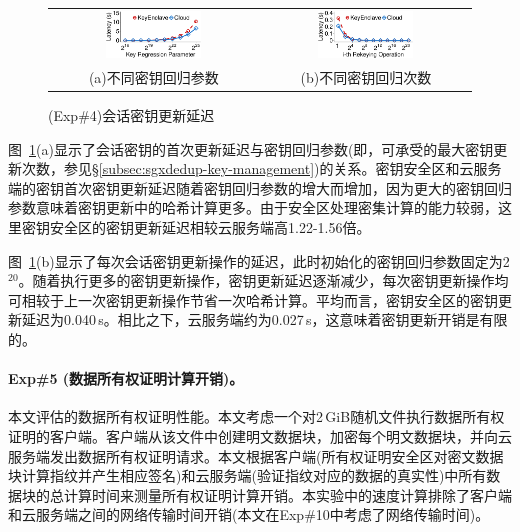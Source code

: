\begin{figure}[!htb]
    \centering
    \begin{tabular}{@{\ }c@{\ }c}
        \includegraphics[width=0.48\textwidth]{pic/sgxdedup/plot/exp_a5/expa5_keyRegression_time.pdf} & 
        \includegraphics[width=0.48\textwidth]{pic/sgxdedup/plot/exp_a5/expa5_keyRegression_time_default.pdf} \\
        \mbox{\small (a)不同密钥回归参数}                                                             & 
        \mbox{\small (b)不同密钥回归次数}
    \end{tabular}
    \caption{(Exp\#4)会话密钥更新延迟}
    \label{fig:sgxdedup-rekeyingLatency}
\end{figure}

图~\ref{fig:sgxdedup-rekeyingLatency}(a)显示了会话密钥的首次更新延迟与密钥回归参数(即，可承受的最大密钥更新次数，参见\S\ref{subsec:sgxdedup-key-management})的关系。密钥安全区和云服务端的密钥首次密钥更新延迟随着密钥回归参数的增大而增加，因为更大的密钥回归参数意味着密钥更新中的哈希计算更多。由于安全区处理密集计算的能力较弱\cite{harnik2018SGX}，这里密钥安全区的密钥更新延迟相较云服务端高1.22-1.56倍。

图~\ref{fig:sgxdedup-rekeyingLatency}(b)显示了每次会话密钥更新操作的延迟，此时初始化的密钥回归参数固定为2$^{20}$。随着执行更多的密钥更新操作，密钥更新延迟逐渐减少，每次密钥更新操作均可相较于上一次密钥更新操作节省一次哈希计算。平均而言，密钥安全区的密钥更新延迟为0.040\,s。相比之下，云服务端约为0.027\,s，这意味着密钥更新开销是有限的。

\paragraph*{Exp\#5 (数据所有权证明计算开销)。}本文评估\sysnameS 的数据所有权证明性能。本文考虑一个对2\,GiB随机文件执行数据所有权证明的客户端。客户端从该文件中创建明文数据块，加密每个明文数据块，并向云服务端发出数据所有权证明请求。本文根据客户端(所有权证明安全区对密文数据块计算指纹并产生相应签名)和云服务端(验证指纹对应的数据的真实性)中所有数据块的总计算时间来测量所有权证明计算开销。本实验中的速度计算排除了客户端和云服务端之间的网络传输时间开销(本文在Exp\#10中考虑了网络传输时间)。

